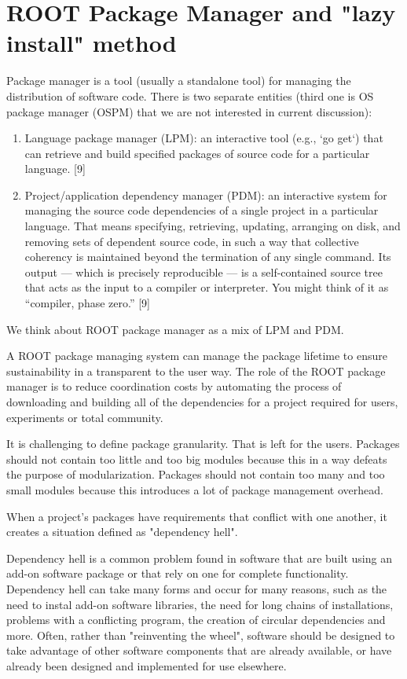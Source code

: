 \documentclass{webofc}
\begin{document}
\section{ROOT Package Manager and "lazy install" method}

Package manager is a tool (usually a standalone tool) for managing the distribution of software code. 
There is two separate entities (third one is OS package manager (OSPM) that we are not interested in current discussion):
\begin{enumerate}
\item Language package manager (LPM): an interactive tool (e.g., `go get`) that can retrieve and build specified packages of source code for a particular language. [9]
\item Project/application dependency manager (PDM): an interactive system for managing the source code dependencies of a single project in a particular language. That means specifying, retrieving, updating, arranging on disk, and removing sets of dependent source code, in such a way that collective coherency is maintained beyond the termination of any single command. Its output — which is precisely reproducible — is a self-contained source tree that acts as the input to a compiler or interpreter. You might think of it as “compiler, phase zero.” [9]
\end{enumerate}
We think about ROOT package manager as a mix of LPM and PDM.

A ROOT package managing system can manage the package lifetime to ensure sustainability in a transparent to the user way. The role of the ROOT package manager is to reduce coordination costs by automating the process of downloading and building all of the dependencies for a project required for users, experiments or total community.

It is challenging to define package granularity. That is left for the users. Packages should not contain too little and too big modules because this in a way defeats the purpose of modularization. Packages should not contain too many and too small modules because this introduces a lot of package management overhead.

When a project's packages have requirements that conflict with one another, it creates a situation defined as "dependency hell".

Dependency hell is a common problem found in software that are built using an add-on software package or that rely on one for complete functionality. Dependency hell can take many forms and occur for many reasons, such as the need to instal add-on software libraries, the need for long chains of installations, problems with a conflicting program, the creation of circular dependencies and more.
Often, rather than "reinventing the wheel", software should be designed to take advantage of other software components that are already available, or have already been designed and implemented for use elsewhere.
\end{document}
